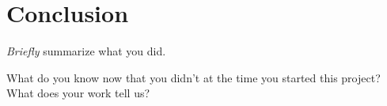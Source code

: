 \section{Conclusion}

\emph{Briefly} summarize what you did.

What do you know now that you didn't at the time you started this project?
What does your work tell us?
